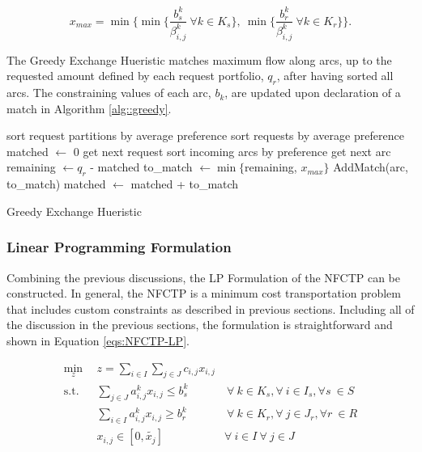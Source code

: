\begin{equation}
  x_{max} = \min 
        \lbrace 
        \min \lbrace \frac{b^k_s}{\beta^k_{i, j}} 
        \: \forall k \in K_s \rbrace, 
        \: \min \lbrace \frac{b^k_r}{\beta^k_{i, j}} 
        \: \forall k \in K_r \rbrace
        \rbrace.
\end{equation}

The Greedy Exchange Hueristic matches maximum flow along arcs, up to the
requested amount defined by each request portfolio, $q_r$, after having sorted
all arcs. The constraining values of each arc, $b_k$, are updated upon
declaration of a match in Algorithm \ref{alg::greedy}.

\begin{algorithm}[!h]
 \SetAlgoLined
 sort request partitions by average preference\;
  {
   sort requests by average preference\;
   matched $\leftarrow$ 0\;        
    {
     get next request\;
     sort incoming arcs by preference\;
      {
       get next arc\;
       remaining $\leftarrow q_r$ - matched\;
       to\_match $\leftarrow \min \lbrace$remaining, $x_{max} \rbrace$\;
       AddMatch(arc, to\_match)\;
       matched $\leftarrow$ matched + to\_match\;
     }
   }
 }
 \caption{Greedy Exchange Hueristic}\label{alg::greedy}
\end{algorithm}

\subsubsection{Linear Programming Formulation}\label{abm:dre:lp}

Combining the previous discussions, the LP Formulation of the NFCTP can be
constructed. In general, the NFCTP is a minimum cost transportation problem that
includes custom constraints as described in previous sections. Including all of
the discussion in the previous sections, the formulation is straightforward and
shown in Equation \ref{eqs:NFCTP-LP}.

\begin{subequations}\label{eqs:NFCTP-LP}
  \begin{align}
    \min_{z} \:\: & 
    z = \sum_{i \in I}\sum_{j \in J}c_{i,j} x_{i,j} 
    & \label{eqs:NFCTP-LP_obj} \\
    \text{s.t.} \:\: &
    \sum_{j \in J}a^k_{i,j} x_{i,j} \leq b^k_s 
    &
    \: \forall \: k \in K_s,  
    \forall \: i \in I_s, 
    \forall s \: \in S \label{eqs:NFCTP-LP_sup} \\
    &
    \sum_{i \in I}a^k_{i,j} x_{i,j} \geq b^k_r 
    &
    \: \forall \: k \in K_r,  
    \forall \: j \in J_r, 
    \forall r \: \in R \label{eqs:NFCTP-LP_req} \\
    &
    x_{i,j} \in [0, \tilde{x_j}]
    &
    \forall \: i \in I \: \forall \: j \in J \label{eqs:NFCTP-LP_x}
  \end{align}
\end{subequations}

